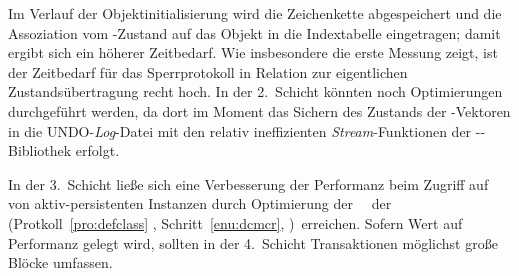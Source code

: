 %
Im Verlauf der Objektinitialisierung wird die Zeichenkette
abgespeichert und die Assoziation vom \Slt\/-Zustand auf das Objekt
in die Indextabelle eingetragen; damit ergibt sich ein h\"{o}herer
Zeitbedarf.
%
%
Wie insbesondere die erste Messung zeigt, ist der Zeitbedarf f\"{u}r das
Sperrprotokoll in Relation zur eigentlichen Zustands\"{u}bertragung recht
hoch. In der 2.~Schicht  k\"{o}nnten noch Optimierungen durchgef\"{u}hrt
werden, da dort im Moment das Sichern des Zustands der
\postore-Vektoren in die UNDO-{\em Log\/}-Datei mit den relativ
ineffizienten {\em Stream\/}-Funktionen der \std-\clogo-Bibliothek
erfolgt.
%
\par{}In der 3.~Schicht lie\ss{}e sich eine Verbesserung der Performanz
beim Zugriff auf \Slt[s]\/ von aktiv-persistenten Instanzen durch
Optimierung der \spc[n]\ \mtd[n]\ der \gfn[n]\ 
\ \ifbericht
\cite[]{bib:ki94a} \else (Protkoll~\ref{pro:defclass}
\stfn{(defclass)}, Schritt~\ref{enu:dcmcr},
\citepage{\pageref{enu:dcmcr}})\fi\ erreichen. Sofern Wert auf
Performanz gelegt wird, sollten in der 4.~Schicht Transaktionen
m\"{o}glichst gro\ss{}e Bl\"{o}cke umfassen.
%

